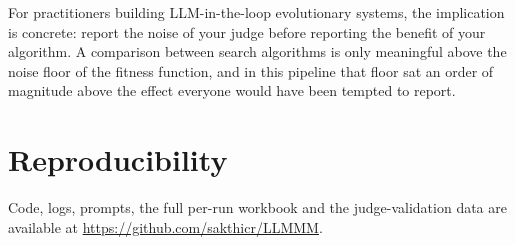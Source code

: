 \documentclass[conference]{IEEEtran}
\begin{document}
For practitioners building LLM-in-the-loop evolutionary systems, the implication
is concrete: report the noise of your judge before reporting the benefit of your
algorithm. A comparison between search algorithms is only meaningful above the
noise floor of the fitness function, and in this pipeline that floor sat an order
of magnitude above the effect everyone would have been tempted to report.

\section*{Reproducibility}
Code, logs, prompts, the full per-run workbook and the judge-validation data are
available at \url{https://github.com/sakthicr/LLMMM}.



\end{document}
